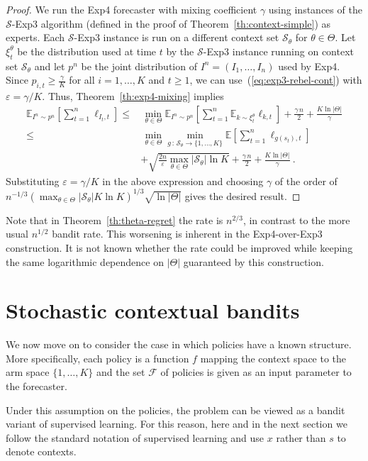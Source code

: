 \documentclass[11pt]{hackednow}
\newcommand{\E}{\mathbb{E}}
\newcommand{\cF}{\mathcal{F}}
\newcommand{\cS}{\mathcal{S}}
\newcommand{\ve}{\varepsilon}
\begin{document}
%
\begin{proof}
We run the Exp4 forecaster with mixing coefficient $\gamma$ using instances of the $\cS$-Exp3 algorithm (defined in the proof of Theorem~\ref{th:context-simple}) as experts. Each $\cS$-Exp3 instance is run on a different context set $\cS_{\theta}$ for $\theta\in\Theta$. Let $\xi_t^{\theta}$ be the distribution used at time $t$ by the $\cS$-Exp3 instance running on context set $\cS_{\theta}$ and let $p^n$ be the joint distribution of $I^n = (I_1,\dots,I_n)$ used by Exp4. Since $p_{i,t} \ge \tfrac{\gamma}{K}$ for all $i=1,\dots,K$ and $t\ge 1$, we can use~(\ref{eq:exp3-rebel-cont}) with $\ve = \gamma/K$. Thus, Theorem~\ref{th:exp4-mixing} implies
\begin{align*}
    \E_{I^n \sim p^n}\left[ \sum_{t=1}^n \ell_{I_t,t} \right]
\le &\,
    \min_{\theta\in\Theta} \E_{I^n \sim p^n}\left[\sum_{t=1}^n \E_{k \sim \xi_t^\theta} \ell_{k,t} \right]
+
    \frac{\gamma\,n}{2} + \frac{K\ln|\Theta|}{\gamma}
\\ \le &\,
    \min_{\theta\in\Theta} \min_{g \,:\, \cS_{\theta}\to\{1,\dots,K\}} \E\left[ \sum_{t=1}^n \ell_{g(s_t),t} \right]
\\ &
    + \sqrt{\frac{2 n}{\ve}\max_{\theta\in\Theta}|\cS_{\theta}| \ln K} + \frac{\gamma\,n}{2} + \frac{K\ln |\Theta|}{\gamma}~.
\end{align*}
Substituting $\ve = \gamma/K$ in the above expression and choosing $\gamma$ of the order of
$
	n^{-1/3}\left(\max_{\theta\in\Theta}|\cS_{\theta}|K\ln K\right)^{1/3}\sqrt{\ln|\Theta|}
$
gives the desired result.
\end{proof}
%
Note that in Theorem~\ref{th:theta-regret} the rate is $n^{2/3}$, in contrast to the more usual $n^{1/2}$ bandit rate. This worsening is inherent in the Exp4-over-Exp3 construction. It is not known whether the rate could be improved while keeping the same logarithmic dependence on $|\Theta|$ guaranteed by this construction.


\section{Stochastic contextual bandits}
\label{s:context-stochastic}
%
We now move on to consider the case in which policies have a known structure. More specifically, each policy is a function $f$ mapping the context space to the arm space $\{1,\dots,K\}$ and the set $\cF$ of policies is given as an input parameter to the forecaster.

Under this assumption on the policies, the problem can be viewed as a bandit variant of supervised learning. For this reason, here and in the next section we follow the standard notation of supervised learning and use $x$ rather than $s$ to denote contexts.
\end{document}
